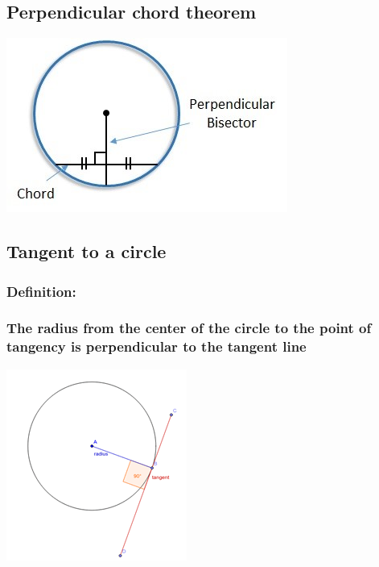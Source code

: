 \documentclass{article}
\begin{document}
\pagebreak

\subsection{Perpendicular chord theorem}

\includegraphics{Picture5.jpg}

\vspace{50px}

\subsection{Tangent to a circle}

\subsubsection{Definition:}
\vspace{20px}

\subsubsection{The radius from the center of the circle to the point of tangency is perpendicular to the tangent line}

\includegraphics{Picture6.png}

\pagebreak
\end{document}
